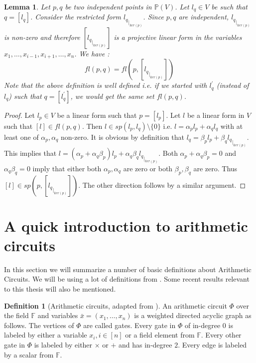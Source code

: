 \documentclass[12pt]{caltech_thesis}
\theoremstyle{plain}
\newtheorem{lemma}{Lemma}
\theoremstyle{definition}
\newtheorem{definition}{Definition}
\newcommand{\F}{\mathbb{F}}
\newcommand{\PP}{\mathbb{P}}
\newcommand{\B}[1]{\bar{#1}}
\begin{document}
\begin{lemma}\label{lemma:linedifferentways}
 Let $p, q$ be two independent points in $\PP(V)$. Let $l_q\in V$ be such that
 $q = [l_q]$. Consider the restricted form ${l_q}_{|_{ker(p)}}$.
 Since $p,q$ are independent, ${l_q}_{|_{ker(p)}}$ is non-zero and therefore $[{l_q}_{|_{ker(p)}}]$ is a projective linear form
 in the variables $x_1,\ldots,x_{i-1},x_{i+1},\ldots,x_n$. We have :
 \[
  fl(p,q) = fl(p,[{l_q}_{|_{ker(p)}}])
 \]
 Note that the above definition is well defined i.e. if we started with $l_q^\prime$ (instead of $l_q$) such that $q=[l_q^\prime]$, we would get the same
 set $fl(p,q)$.
 \end{lemma}
\begin{proof}
 Let $l_p \in V$ be a linear form such that $p=[l_p]$. Let $l$ be a linear form in $V$ such that $[l] \in fl(p,q)$.
 Then $l\in sp(l_p,l_q)\setminus \{0\}$ i.e. $l = \alpha_pl_p+\alpha_ql_q$ with at least one of $\alpha_p,\alpha_q$ non-zero. It is 
 obvious by definition that $l_q = \beta_p l_p + \beta_q {l_q}_{|_{ker(p)}}$. This implies that $l = (\alpha_p + \alpha_q\beta_p)l_p + 
 \alpha_q\beta_q {l_q}_{|_{ker(p)}}$. Both $\alpha_p + \alpha_q\beta_p=0$ and $\alpha_q\beta_q=0$ imply that either both $\alpha_p,\alpha_q$ 
 are zero or both $\beta_p,\beta_q$ are zero. Thus $[l] \in sp(p,[{l_q}_{|_{ker(p)}}])$. The other direction follows by a similar argument.
 
 
 
\end{proof}







\section{A quick introduction to arithmetic circuits}\label{section:circuits}

In this section we will summarize a number of basic definitions about Arithmetic Circuits. We will be using a lot of definitions from 
\cite{SY10}. Some recent results relevant to this thesis will also be mentioned.
\begin{definition}[Arithmetic circuits,  adapted from \cite{SY10}]
  An arithmetic circuit $\Phi$ over the field $\F$ and variables
$\B{x} = (x_1,\ldots,x_n)$ is a weighted directed acyclic graph as follows. The vertices of $\Phi$ are called
gates. Every gate in $\Phi$ of in-degree $0$ is labeled by either a variable $x_i,i\in [n]$ or a field element from
$\F$. Every other gate in $\Phi$ is labeled by either $\times$ or $+$ and has in-degree $2$. Every edge is labeled by 
a scalar from $\F$.
\end{definition}
\end{document}
